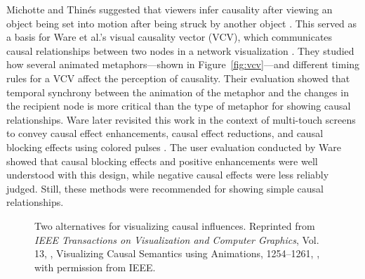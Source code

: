 Michotte and Thin\'es suggested that viewers infer causality after viewing an object being set into motion after being struck by another object \citeyearpar{michotte1963}.  This served as a basis for Ware et al.'s visual causality vector (VCV), which communicates causal relationships between two nodes in a network visualization \citeyearpar{ware1999}.  They studied how several animated metaphors---shown in Figure~\ref{fig:vcv}---and different timing rules for a VCV affect the perception of causality.  Their evaluation showed that temporal synchrony between the animation of the metaphor and the changes in the recipient node is more critical than the type of metaphor for showing causal relationships.  Ware later revisited this work in the context of multi-touch screens to convey causal effect enhancements, causal effect reductions, and causal blocking effects using colored pulses \citeyearpar{ware2013}.  The user evaluation conducted by Ware showed that causal blocking effects and positive enhancements were well understood with this design, while negative causal effects were less reliably judged.  Still, these methods were recommended for showing simple causal relationships.

\begin{figure}
\centering
{} 

\caption[Two alternatives for visualizing causal influences]{Two alternatives for visualizing causal influences.  Reprinted from \textit{IEEE Transactions on Visualization and Computer Graphics}, Vol. 13, \citeauthor{kadaba2007}, Visualizing Causal Semantics using Animations, 1254--1261, \textcopyright \citeyear{kadaba2007}, with permission from IEEE.}

	\label{fig:kadaba}
\end{figure}

